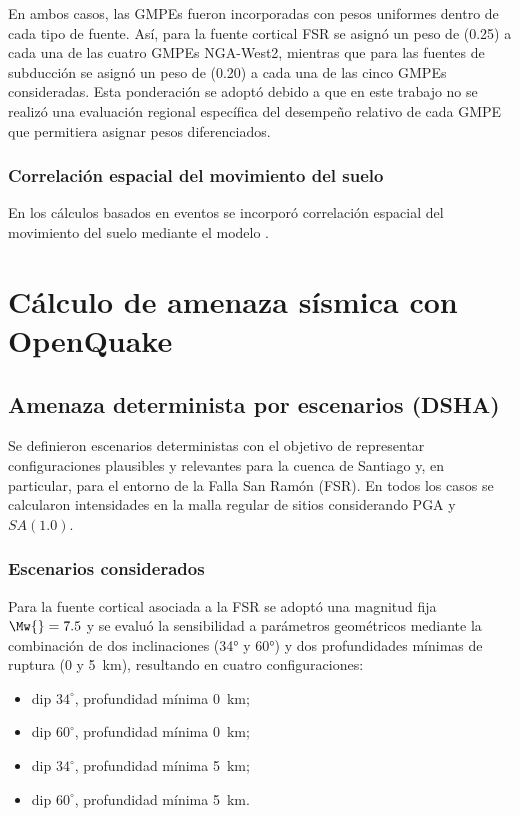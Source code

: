 En ambos casos, las GMPEs fueron incorporadas con pesos uniformes dentro de cada tipo de fuente. Así, para la fuente cortical FSR se asignó un peso de (0.25) a cada una de las cuatro GMPEs NGA-West2, mientras que para las fuentes de subducción se asignó un peso de (0.20) a cada una de las cinco GMPEs consideradas. Esta ponderación se adoptó debido a que en este trabajo no se realizó una evaluación regional específica del desempeño relativo de cada GMPE que permitiera asignar pesos diferenciados.

\subsubsection{Correlación espacial del movimiento del suelo}
\label{sec:meto_correlacion}

En los cálculos basados en eventos se incorporó correlación espacial del movimiento del suelo mediante el modelo .

\section{Cálculo de amenaza sísmica con OpenQuake}
\label{sec:meto_calculo_amenaza}

\subsection{Amenaza determinista por escenarios (DSHA)}
\label{sec:meto_dsha}

Se definieron escenarios deterministas con el objetivo de representar configuraciones plausibles y relevantes para la cuenca de Santiago y, en particular, para el entorno de la Falla San Ramón (FSR). En todos los casos se calcularon intensidades en la malla regular de sitios considerando PGA y $SA(1.0)$.

\subsubsection{Escenarios considerados}
\label{sec:meto_dsha_escenarios}

Para la fuente cortical asociada a la FSR se adoptó una magnitud fija $\Mw{}=7.5$ y se evaluó la sensibilidad a parámetros geométricos mediante la combinación de dos inclinaciones (34° y 60°) y dos profundidades mínimas de ruptura (0 y 5~km), resultando en cuatro configuraciones:
\begin{itemize}
    \item dip $34^\circ$, profundidad mínima 0~km;
    \item dip $60^\circ$, profundidad mínima 0~km;
    \item dip $34^\circ$, profundidad mínima 5~km;
    \item dip $60^\circ$, profundidad mínima 5~km.
\end{itemize}

